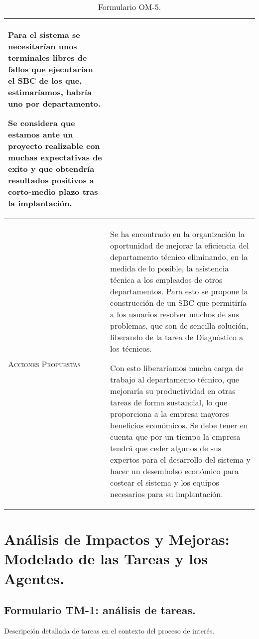 \documentclass[12pt,a4paper,twoside,spanish]{article}      %
\begin{document}
\begin{table}[H]
\begin{tabularx}{\textwidth}{|l|X|}
Para el sistema se necesitarían unos terminales libres de fallos que ejecutarían el SBC de los que, estimaríamos, habría uno por departamento.

Se considera que estamos ante un proyecto realizable con muchas expectativas de exito y que obtendría resultados positivos a corto-medio plazo tras la implantación.


\\ \hline
\textsc{Acciones Propuestas}
 & Se ha encontrado en la organización la oportunidad de mejorar la eficiencia del departamento técnico eliminando, en la medida de lo posible, la asistencia técnica a los empleados de otros departamentos. Para esto se propone la construcción de un SBC que permitiría a los usuarios resolver muchos de sus problemas, que son de sencilla solución, liberando de la tarea de Diagnóstico a los técnicos.
 
 Con esto liberaríamos mucha carga de trabajo al departamento técnico, que mejoraría su productividad en otras tareas de forma sustancial, lo que proporciona a la empresa mayores beneficios económicos. Se debe tener en cuenta que por un tiempo la empresa tendrá que ceder algunos de sus expertos para el desarrollo del sistema y hacer un desembolso económico para costear el sistema y los equipos necesarios para su implantación.
 \\ \hline
\end{tabularx}
\caption{Formulario OM-5.}
  \label{tab.OM5_2}
\end{table}



\section{Análisis de Impactos y Mejoras: Modelado de las Tareas y los Agentes.}


\subsection{Formulario TM-1: análisis de tareas.}

Descripción detallada de tareas en el contexto del proceso de interés.
\end{document}
